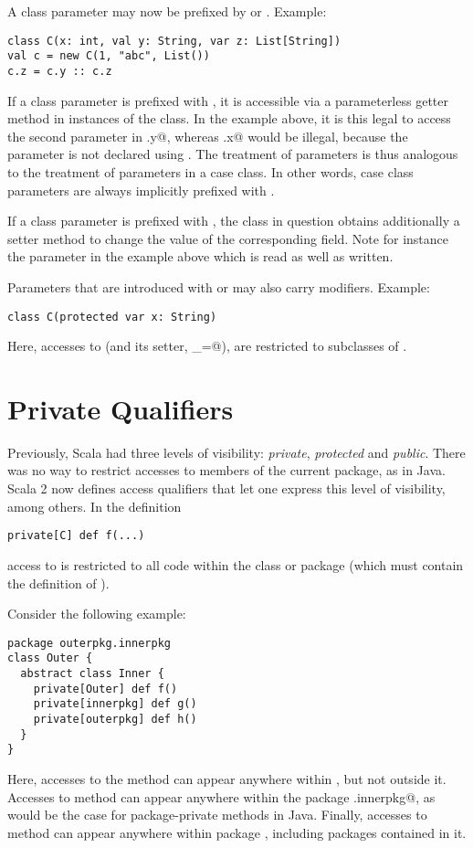 \documentclass[a4paper,11pt,twoside]{article}
\begin{document}
A class parameter may now be prefixed by \lstinline@val@ or
\lstinline@var@. Example:
\begin{lstlisting}
class C(x: int, val y: String, var z: List[String])
val c = new C(1, "abc", List())
c.z = c.y :: c.z
\end{lstlisting}
If a class parameter is prefixed with \lstinline@val@, it is
accessible via a parameterless getter method in instances of the
class.  In the example above, it is this legal to access the second
parameter in \lstinline@c.y@, whereas \lstinline@c.x@ would be
illegal, because the \lstinline@x@ parameter is not declared using
\lstinline@val@. The treatment of \lstinline@val@ parameters is thus
analogous to the treatment of parameters in a case class. In other words,
case class parameters are always implicitly prefixed with \lstinline@val@.

If a class parameter is prefixed with \lstinline@var@, the class in
question obtains additionally a setter method to change the value of
the corresponding field. Note for instance the \lstinline@z@ parameter
in the example above which is read as well as written.

Parameters that are introduced with \lstinline@val@ or \lstinline@var@
may also carry modifiers. Example:
\begin{lstlisting}
class C(protected var x: String)
\end{lstlisting}
Here, accesses to \lstinline@x@ (and its setter, \lstinline@x_=@), are
restricted to subclasses of \lstinline@C@.

\section{Private Qualifiers}\label{privatequals}

Previously, Scala had three levels of visibility: {\em private},
{\em protected} and {\em public}. There was no way to
restrict accesses to members of the current package, as in Java. Scala
2 now defines access qualifiers that let one express this level of
visibility, among others. In the definition
\begin{lstlisting}
private[C] def f(...)
\end{lstlisting}
access to \lstinline@f@ is restricted to all code within the class or
package \lstinline@C@ (which must contain the definition of \lstinline@f@).

Consider the following example:
\begin{lstlisting}
package outerpkg.innerpkg
class Outer {
  abstract class Inner {
    private[Outer] def f()
    private[innerpkg] def g()
    private[outerpkg] def h()
  }
}
\end{lstlisting}
Here, accesses to the method \lstinline@f@ can appear anywhere within
\lstinline@OuterClass@, but not outside it. Accesses to method
\lstinline@g@ can appear anywhere within the package
\lstinline@outerpkg.innerpkg@, as would be the case for
package-private methods in Java. Finally, accesses to method
\lstinline@h@ can appear anywhere within package \lstinline@outerpkg@,
including packages contained in it. 
\end{document}
